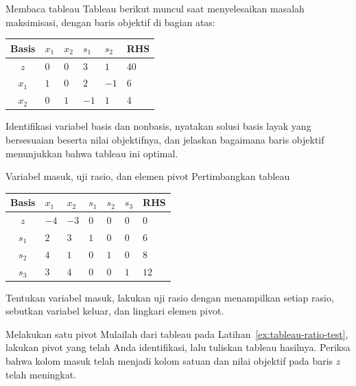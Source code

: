 \begin{ex}{Membaca tableau}{}
\label{ex:tableau-reading}
 Tableau berikut muncul saat menyelesaikan masalah maksimisasi, dengan
baris objektif di bagian atas:
\begin{center}
\renewcommand{\arraystretch}{1.3}
\begin{tabular}{c|ZZZZ|Z}
\toprule
Basis & $x_1$ & $x_2$ & $s_1$ & $s_2$ & RHS\\
\midrule
$z$   & $0$ & $0$ & $3$ & $1$ & $40$\\
\midrule
$x_1$ & $1$ & $0$ & $2$  & $-1$ & $6$\\
$x_2$ & $0$ & $1$ & $-1$ & $1$  & $4$\\
\bottomrule
\end{tabular}
\end{center}
Identifikasi variabel basis dan nonbasis, nyatakan solusi basis layak yang
bersesuaian beserta nilai objektifnya, dan jelaskan bagaimana baris objektif
menunjukkan bahwa tableau ini optimal.
\exrefs{\S\ref{sec:tableau-building}; \S\ref{sec:tableau-optimality}}
\end{ex}

\begin{ex}{Variabel masuk, uji rasio, dan elemen pivot}{}
\label{ex:tableau-ratio-test}
 Pertimbangkan tableau
\begin{center}
\renewcommand{\arraystretch}{1.3}
\begin{tabular}{c|ZZZZZ|Z}
\toprule
Basis & $x_1$ & $x_2$ & $s_1$ & $s_2$ & $s_3$ & RHS\\
\midrule
$z$   & $-4$ & $-3$ & $0$ & $0$ & $0$ & $0$\\
\midrule
$s_1$ & $2$ & $3$ & $1$ & $0$ & $0$ & $6$\\
$s_2$ & $4$ & $1$ & $0$ & $1$ & $0$ & $8$\\
$s_3$ & $3$ & $4$ & $0$ & $0$ & $1$ & $12$\\
\bottomrule
\end{tabular}
\end{center}
Tentukan variabel masuk, lakukan uji rasio dengan menampilkan setiap rasio,
sebutkan variabel keluar, dan lingkari elemen pivot.
\exrefs{\S\ref{sec:tableau-pivot}}
\end{ex}


\begin{ex}{Melakukan satu pivot}{}
\label{ex:tableau-one-pivot}
 Mulailah dari tableau pada Latihan~\ref{ex:tableau-ratio-test},
lakukan pivot yang telah Anda identifikasi, lalu tuliskan tableau hasilnya.
Periksa bahwa kolom masuk telah menjadi kolom satuan dan nilai objektif pada
baris $z$ telah meningkat.
\exrefs{\S\ref{sec:tableau-pivot}}
\end{ex}

